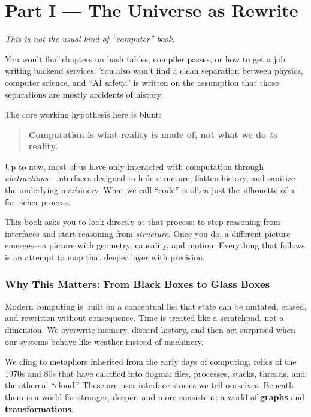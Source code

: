 \chapter*{Part I --- The Universe as Rewrite}

\emph{This is not the usual kind of ``computer'' book.}

You won't find chapters on hash tables, compiler passes, or how to get a job writing backend services. You also won't find a clean separation between physics, computer science, and ``AI safety.'' \COMPUTER{} is written on the assumption that those separations are mostly accidents of history.

The core working hypothesis here is blunt:
\begin{quote}
\textbf{Computation is what reality is made of, not what we do \emph{to} reality.}
\end{quote}

Up to now, most of us have only interacted with computation through 
\emph{abstractions}—interfaces designed to hide structure, flatten history, and 
sanitize the underlying machinery. What we call “code” is often just the 
silhouette of a far richer process.

This book asks you to look directly at that process: to stop reasoning from
interfaces and start reasoning from \emph{structure}. Once you do, a different 
picture emerges—a picture with geometry, causality, and motion. Everything that 
follows is an attempt to map that deeper layer with precision.


\subsection*{Why This Matters: From Black Boxes to Glass Boxes}

Modern computing is built on a conceptual lie: that state can be mutated, erased, and rewritten without consequence. Time is treated like a scratchpad, not a dimension. We overwrite memory, discard history, and then act surprised when our systems behave like weather instead of machinery.

We cling to metaphors inherited from the early days of computing, relics of the 1970s and 80s that have calcified into dogma: files, processes, stacks, threads, and the ethereal ``cloud.'' These are user-interface stories we tell ourselves. Beneath them is a world far stranger, deeper, and more consistent: a world of \textbf{graphs} and \textbf{transformations}.

